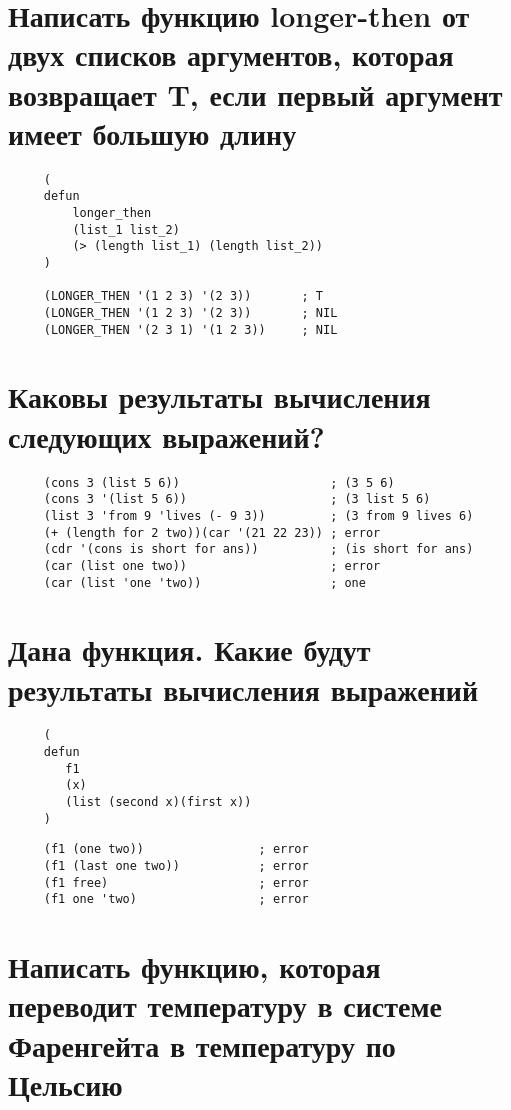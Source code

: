 \section{Написать функцию longer-then от двух списков аргументов, которая возвращает T, если первый аргумент имеет большую длину}

\begin{lstlisting}
     (
     defun
         longer_then
         (list_1 list_2)
         (> (length list_1) (length list_2))
     )

     (LONGER_THEN '(1 2 3) '(2 3))       ; T
     (LONGER_THEN '(1 2 3) '(2 3))       ; NIL
     (LONGER_THEN '(2 3 1) '(1 2 3))     ; NIL
\end{lstlisting}


\section{Каковы результаты вычисления следующих выражений?}

\begin{lstlisting}
     (cons 3 (list 5 6))                     ; (3 5 6)
     (cons 3 '(list 5 6))                    ; (3 list 5 6)
     (list 3 'from 9 'lives (- 9 3))         ; (3 from 9 lives 6)
     (+ (length for 2 two))(car '(21 22 23)) ; error
     (cdr '(cons is short for ans))          ; (is short for ans)
     (car (list one two))                    ; error
     (car (list 'one 'two))                  ; one
\end{lstlisting}

\section{Дана функция. Какие будут результаты вычисления выражений}

\begin{lstlisting}
     (
     defun
        f1
        (x)
        (list (second x)(first x))
     )
\end{lstlisting}

\begin{lstlisting}
     (f1 (one two))                ; error
     (f1 (last one two))           ; error
     (f1 free)                     ; error
     (f1 one 'two)                 ; error
\end{lstlisting}

\section{Написать функцию, которая переводит температуру в системе Фаренгейта в температуру по Цельсию}

